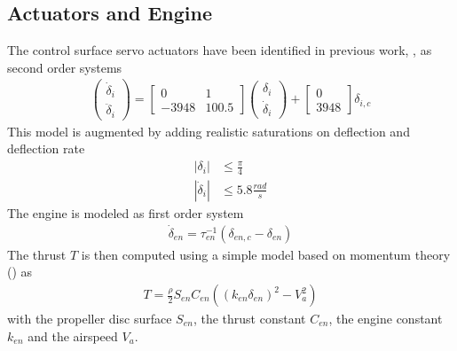 \documentclass{ifacconf}
\begin{document}
\subsection{Actuators and Engine}
The control surface servo actuators have been identified in previous work, \cite{ameho2013pilotage}, as second order systems 
\begin{align}
\begin{pmatrix}
\dot{\delta}_i \\
\ddot{\delta}_i
\end{pmatrix}
=
\begin{bmatrix}
0 & 1 \\
-3948 & 100.5 
\end{bmatrix}
\begin{pmatrix}
\delta_i \\
\dot{\delta}_i
\end{pmatrix}
+
\begin{bmatrix}
0\\
3948 
\end{bmatrix}
\delta_{i, c}
\end{align}
This model is augmented by adding realistic saturations on deflection and deflection rate
%
\begin{align}
|\delta_i| &\leq \frac{\pi}{4} \\
|\dot{\delta}_i| &\leq 5.8 \frac{rad}{s}
\end{align}
The engine is modeled as first order system
%
\begin{align}
\dot{\delta}_{en}
=
\tau_{en}^{-1}
(
\delta_{en, c}
- \delta_{en}
)
\end{align}
%
The thrust $T$ is then computed using a simple model based on momentum theory (\cite{Beard2012}) as
%
\begin{align}
T = \frac{\rho}{2}
S_{en}
C_{en} 
(
(k_{en}\delta_{en})^2
-V_a^2
)
\end{align}
with the propeller disc surface $S_{en}$, the thrust constant $C_{en}$, the engine constant $k_{en}$ and the airspeed $V_a$.
%
%
\end{document}
